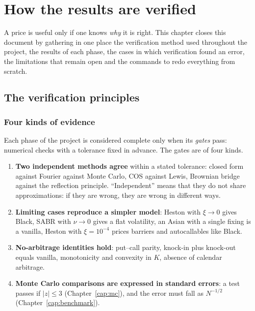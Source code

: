\chapter{How the results are verified}
\label{cap:validazione}

A price is useful only if one knows \emph{why} it is right. This chapter closes this document by gathering in one place the
verification method used throughout the project, the results of each phase, the cases in which verification found an
error, the limitations that remain open and the commands to redo everything from scratch.

\section{The verification principles}
\subsection{Four kinds of evidence}
Each phase of the project is considered complete only when its \emph{gates} pass: numerical checks with a tolerance
fixed in advance. The gates are of four kinds.
\begin{enumerate}
\item \textbf{Two independent methods agree} within a stated tolerance: closed form against Fourier against Monte
Carlo, COS against Lewis, Brownian bridge against the reflection principle. ``Independent'' means that they do not
share approximations: if they are wrong, they are wrong in different ways.
\item \textbf{Limiting cases reproduce a simpler model}: Heston with $\xi\to0$ gives Black, SABR with $\nu\to0$ gives
a flat volatility, an Asian with a single fixing is a vanilla, Heston with $\xi=10^{-4}$ prices barriers and
autocallables like Black.
\item \textbf{No-arbitrage identities hold}: put--call parity, knock-in plus knock-out equals vanilla, monotonicity and
convexity in $K$, absence of calendar arbitrage.
\item \textbf{Monte Carlo comparisons are expressed in standard errors}: a test passes if $|z|\le3$ (Chapter~\ref{cap:mc}), and the error must fall as $N^{-1/2}$ (Chapter~\ref{cap:benchmark}).
\end{enumerate}

